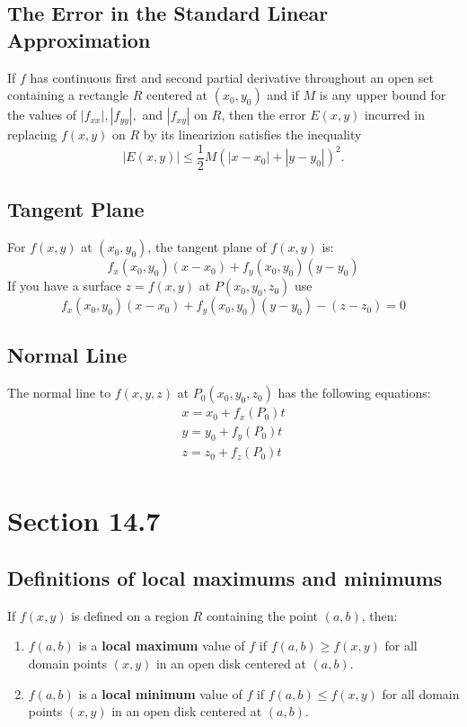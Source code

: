 \documentclass[12pt]{article}
\theoremstyle{break}
\numberwithin{theorem}{subsection}
\numberwithin{lemma}{subsection}
\numberwithin{corollary}{subsection}
\numberwithin{equation}{subsection}
\begin{document}
\subsection{The Error in the Standard Linear Approximation}
If $f$ has continuous first and second partial derivative throughout an open set containing a 
rectangle $R$ centered at $(x_0, y_0)$ and if $M$ is any upper bound for the values of $|f_{xx}|,
|f_{yy}|,$ and $|f_{xy}|$ on $R$, then the error $E(x,y)$ incurred in replacing $f(x,y)$ on $R$ by
its linearizion satisfies the inequality
\begin{equation}
|E(x,y)| \leq \frac12 M(|x-x_0| + |y-y_0|)^2 .
\end{equation}

\subsection{Tangent Plane}
For $f(x,y)$ at $(x_0, y_0)$, the tangent plane of $f(x,y)$ is:
\begin{equation} 
f_x(x_0,y_0)(x-x_0) + f_y(x_0,y_0)(y-y_0) 
\end{equation}
If you have a surface $z = f(x,y)$ at $P(x_0,y_0,z_0)$ use 
\begin{equation}
f_x(x_0,y_0)(x-x_0) + f_y(x_0,y_0)(y-y_0) - (z-z_0) = 0
\end{equation}

\subsection{Normal Line}
The normal line to $f(x,y,z)$ at $P_0 (x_0,y_0,z_0)$ has the following equations:
\begin{align*}
x = x_0 + f_x(P_0)t \\
y = y_0 + f_y(P_0)t \\
z = z_0 + f_z(P_0)t \\
\end{align*}

\newpage
\section{Section 14.7}

\subsection{Definitions of local maximums and minimums}
If $f(x,y)$ is defined on a region $R$ containing the point $(a,b)$, then:
\begin{enumerate}
\item $f(a,b)$ is a \textbf{local maximum} value of $f$ if $f(a,b) \geq f(x,y)$ for all domain
	points $(x,y)$ in an open disk centered at $(a,b)$.
\item $f(a,b)$ is a \textbf{local minimum} value of $f$ if $f(a,b) \leq f(x,y)$ for all domain
	points $(x,y)$ in an open disk centered at $(a,b)$.
\end{enumerate}
\end{document}
